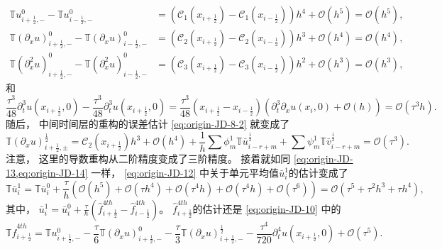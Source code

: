 \begin{align}
  {\mathbb{T}} u_{i+\frac{1}{2},-}^{0} - {\mathbb{T}} u_{i-\frac{1}{2},-}^{0}
   & = \left(\mathcal{C}_1(x_{i+\frac{1}{2}})-\mathcal{C}_1(x_{i-\frac{1}{2}})\right)h^4+{\mathcal{O}}(h^{5})={\mathcal{O}}(h^{5}),  \\
  {\mathbb{T}}\left({\partial_x}u\right)_{i+\frac12,-}^0-{\mathbb{T}}\left({\partial_x}u\right)_{i-\frac12,-}^0
   & = \left(\mathcal{C}_2(x_{i+\frac{1}{2}})-\mathcal{C}_2(x_{i-\frac{1}{2}})\right)h^3+{\mathcal{O}}(h^{4})={\mathcal{O}}(h^{4}),  \\
  {\mathbb{T}}\left({\partial_x^2}u\right)_{i+\frac12,-}^0-{\mathbb{T}}\left({\partial_x^2}u\right)_{i-\frac12,-}^0
   & = \left(\mathcal{C}_3(x_{i+\frac{1}{2}})-\mathcal{C}_3(x_{i-\frac{1}{2}})\right)h^2+{\mathcal{O}}(h^{3})={\mathcal{O}}(h^{3}),
\end{align}
和
\begin{equation}
  \frac{\tau^3}{48} {\partial_{t}^3} u(x_{i+\frac 12},0) - \frac{\tau^3}{48} {\partial_{t}^3} u(x_{i+\frac 12},0) = \frac{\tau^3}{48} \left(x_{i+\frac 12}-x_{i-\frac 12}\right) \left({\partial_{t}^3\partial_{x}} u(x_i,0) + \mathcal{O}(h)\right) = \mathcal{O}(\tau^3 h).
\end{equation}
随后，
中间时间层的重构的误差估计 \cref{eq:origin-JD-8-2} 就变成了
\begin{equation}
  {\mathbb{T}}\left({\partial_x}u\right)_{i+\frac12,\pm}^{\frac 12} = \mathcal{C}_2(x_{i+\frac{1}{2}})h^3+{\mathcal{O}}(h^{4}) + \frac{1}{h} \sum \phi_m^1 {\mathbb{T}} \bar u_{i-r+m}^{\frac 12} + \sum \psi_m^1 {\mathbb{T}} \bar v_{i-r+m}^{\frac 12} = {\mathcal{O}}(\tau^3).
\end{equation}
注意，
这里的导数重构从二阶精度变成了三阶精度。
接着就如同 \cref{eq:origin-JD-13,eq:origin-JD-14} 一样，
\cref{eq:origin-JD-12} 中关于单元平均值$\bar u_{i}^{1}$的估计变成了
\begin{equation}
  {\mathbb{T}} \bar u_{i}^{1} = {\mathbb{T}} \bar u_{i}^{0} + \frac{\tau}{h} \left(\mathcal{O}(h^5)+\mathcal{O}(\tau h^4)+\mathcal{O}(\tau^4 h)+\mathcal{O}(\tau^4 h)+\mathcal{O}(\tau^6)\right) = {\mathcal{O}}(\tau^5+\tau^2 h^3+\tau h^4),
\end{equation}
其中，
$\bar u_{i}^{1}= \bar u_{i}^{0} + \frac{\tau}{h} \left(\hat{f}^{4th}_{i+\frac 12}-\hat{f}^{4th}_{i-\frac 12}\right)$。
$\hat{f}^{4th}_{i+\frac 12}$的估计还是 \cref{eq:origin-JD-10} 中的
\begin{equation}
  {\mathbb{T}}\hat{f}^{4th}_{i+\frac 12} = {\mathbb{T}} u_{i+\frac{1}{2},-}^{0}-\frac\tau6 {\mathbb{T}} \left({\partial_{x}} u\right)_{i+\frac 12,-}^{0}-\frac\tau3 {\mathbb{T}} \left({\partial_{x}} u\right)_{i+\frac 12,-}^{\frac{1}{2}} - \frac{\tau^4}{720} {\partial_{t}^4} u(x_{i+\frac 12},0)+{\mathcal{O}}(\tau^5).
\end{equation}


